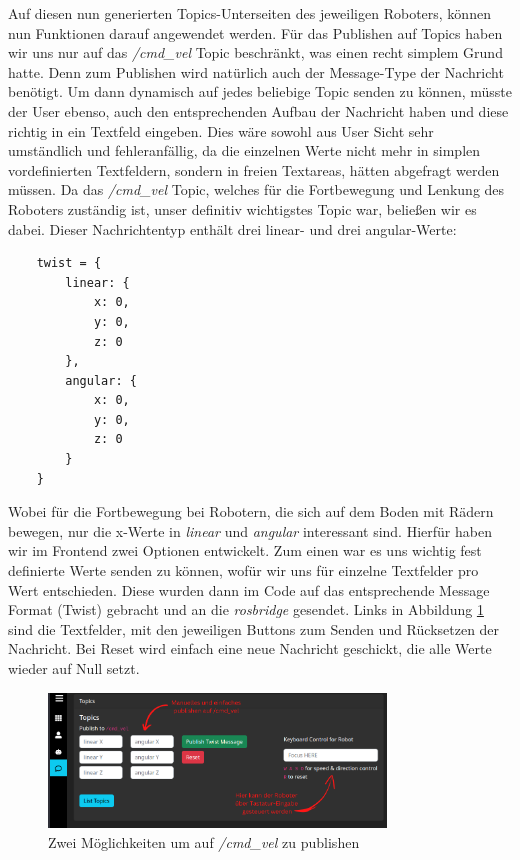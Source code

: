\begin{flushleft}
Auf diesen nun generierten Topics-Unterseiten des jeweiligen Roboters, können nun Funktionen darauf angewendet werden.
Für das Publishen auf Topics haben wir uns nur auf das \textit{/cmd\_vel} Topic beschränkt, was einen recht simplem Grund hatte.
Denn zum Publishen wird natürlich auch der Message-Type der Nachricht benötigt.
Um dann dynamisch auf jedes beliebige Topic senden zu können, müsste der User ebenso, auch den entsprechenden Aufbau der Nachricht haben und diese richtig in ein Textfeld eingeben.
Dies wäre sowohl aus User Sicht sehr umständlich und fehleranfällig, da die einzelnen Werte nicht mehr in simplen vordefinierten Textfeldern, sondern in freien Textareas, hätten abgefragt werden müssen. 
Da das \textit{/cmd\_vel} Topic, welches für die Fortbewegung und Lenkung des Roboters zuständig ist, unser definitiv wichtigstes Topic war, beließen wir es dabei.
Dieser Nachrichtentyp enthält drei linear- und drei angular-Werte:

\label{sec:twistMessage}
\begin{lstlisting}
    twist = {
        linear: {
            x: 0,
            y: 0,
            z: 0
        },
        angular: {
            x: 0,
            y: 0,
            z: 0
        }
    }
\end{lstlisting}
Wobei für die Fortbewegung bei Robotern, die sich auf dem Boden mit Rädern bewegen, nur die x-Werte in \textit{linear} und \textit{angular} interessant sind.
Hierfür haben wir im Frontend zwei Optionen entwickelt. 
Zum einen war es uns wichtig fest definierte Werte senden zu können, wofür wir uns für einzelne Textfelder pro Wert entschieden.
Diese wurden dann im Code auf das entsprechende Message Format (Twist) gebracht und an die \textit{rosbridge} gesendet.
Links in Abbildung \ref{fig:web_publish} sind die Textfelder, mit den jeweiligen Buttons zum Senden und Rücksetzen der Nachricht.
Bei Reset wird einfach eine neue Nachricht geschickt, die alle Werte wieder auf Null setzt.

\begin{figure}[h!]
    \centering
    \includegraphics[width=0.8\textwidth]{imgs/web/web_publish.png}
    \caption{Zwei Möglichkeiten um auf \textit{/cmd\_vel} zu publishen}
    \label{fig:web_publish}%
\end{figure}


\end{flushleft}
